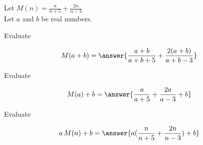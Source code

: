 \documentclass{ximera}
\author{Lee Wayand}
\begin{document}
\begin{exercise}





Let $M(n) = \frac{n}{n+5} + \frac{2n}{n-3}$ \\

Let $a$ and $b$ be real numbers. \\





\begin{question}


Evaluate  

\[
M(a+b) = \answer{\frac{a+b}{a+b+5} + \frac{2(a+b)}{a+b-3}}
\]


\end{question}








\begin{question}


Evaluate  

\[
M(a)+b = \answer{\frac{a}{a+5} + \frac{2a}{a-3} +b}
\]


\end{question}









\begin{question}


Evaluate  

\[
a \, M(n)+b = \answer{a(\frac{n}{n+5} + \frac{2n}{n-3})+b}
\]


\end{question}




















\end{exercise}
\end{document}
